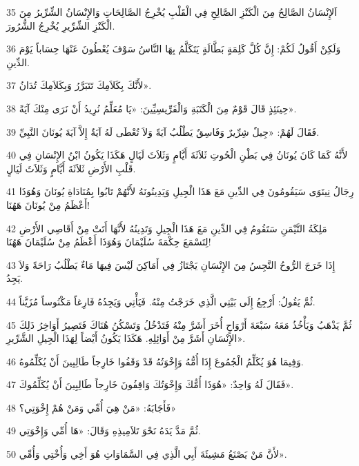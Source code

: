 \par 35 اَلإِنْسَانُ الصَّالِحُ مِنَ الْكَنْزِ الصَّالِحِ فِي الْقَلْبِ يُخْرِجُ الصَّالِحَاتِ وَالإِنْسَانُ الشِّرِّيرُ مِنَ الْكَنْزِ الشِّرِّيرِ يُخْرِجُ الشُّرُورَ.
\par 36 وَلَكِنْ أَقُولُ لَكُمْ: إِنَّ كُلَّ كَلِمَةٍ بَطَّالَةٍ يَتَكَلَّمُ بِهَا النَّاسُ سَوْفَ يُعْطُونَ عَنْهَا حِسَاباً يَوْمَ الدِّينِ.
\par 37 لأَنَّكَ بِكَلاَمِكَ تَتَبَرَّرُ وَبِكَلاَمِكَ تُدَانُ».
\par 38 حِينَئِذٍ قَالَ قَوْمٌ مِنَ الْكَتَبَةِ وَالْفَرِّيسِيِّينَ: «يَا مُعَلِّمُ نُرِيدُ أَنْ نَرَى مِنْكَ آيَةً».
\par 39 فَقَالَ لَهُمْ: «جِيلٌ شِرِّيرٌ وَفَاسِقٌ يَطْلُبُ آيَةً وَلاَ تُعْطَى لَهُ آيَةٌ إِلاَّ آيَةَ يُونَانَ النَّبِيِّ.
\par 40 لأَنَّهُ كَمَا كَانَ يُونَانُ فِي بَطْنِ الْحُوتِ ثَلاَثَةَ أَيَّامٍ وَثَلاَثَ لَيَالٍ هَكَذَا يَكُونُ ابْنُ الإِنْسَانِ فِي قَلْبِ الأَرْضِ ثَلاَثَةَ أَيَّامٍ وَثَلاَثَ لَيَالٍ.
\par 41 رِجَالُ نِينَوَى سَيَقُومُونَ فِي الدِّينِ مَعَ هَذَا الْجِيلِ وَيَدِينُونَهُ لأَنَّهُمْ تَابُوا بِمُنَادَاةِ يُونَانَ وَهُوَذَا أَعْظَمُ مِنْ يُونَانَ هَهُنَا!
\par 42 مَلِكَةُ التَّيْمَنِ سَتَقُومُ فِي الدِّينِ مَعَ هَذَا الْجِيلِ وَتَدِينُهُ لأَنَّهَا أَتَتْ مِنْ أَقَاصِي الأَرْضِ لِتَسْمَعَ حِكْمَةَ سُلَيْمَانَ وَهُوَذَا أَعْظَمُ مِنْ سُلَيْمَانَ هَهُنَا!
\par 43 إِذَا خَرَجَ الرُّوحُ النَّجِسُ مِنَ الإِنْسَانِ يَجْتَازُ فِي أَمَاكِنَ لَيْسَ فِيهَا مَاءٌ يَطْلُبُ رَاحَةً وَلاَ يَجِدُ.
\par 44 ثُمَّ يَقُولُ: أَرْجِعُ إِلَى بَيْتِي الَّذِي خَرَجْتُ مِنْهُ. فَيَأْتِي وَيَجِدُهُ فَارِغاً مَكْنُوساً مُزَيَّناً.
\par 45 ثُمَّ يَذْهَبُ وَيَأْخُذُ مَعَهُ سَبْعَةَ أَرْوَاحٍ أُخَرَ أَشَرَّ مِنْهُ فَتَدْخُلُ وَتَسْكُنُ هُنَاكَ فَتَصِيرُ أَوَاخِرُ ذَلِكَ الإِنْسَانِ أَشَرَّ مِنْ أَوَائِلِهِ. هَكَذَا يَكُونُ أَيْضاً لِهَذَا الْجِيلِ الشَّرِّيرِ».
\par 46 وَفِيمَا هُوَ يُكَلِّمُ الْجُمُوعَ إِذَا أُمُّهُ وَإِخْوَتُهُ قَدْ وَقَفُوا خَارِجاً طَالِبِينَ أَنْ يُكَلِّمُوهُ.
\par 47 فَقَالَ لَهُ وَاحِدٌ: «هُوَذَا أُمُّكَ وَإِخْوَتُكَ وَاقِفُونَ خَارِجاً طَالِبِينَ أَنْ يُكَلِّمُوكَ».
\par 48 فَأَجَابَهُ: «مَنْ هِيَ أُمِّي وَمَنْ هُمْ إِخْوَتِي؟»
\par 49 ثُمَّ مَدَّ يَدَهُ نَحْوَ تَلاَمِيذِهِ وَقَالَ: «هَا أُمِّي وَإِخْوَتِي.
\par 50 لأَنَّ مَنْ يَصْنَعُ مَشِيئَةَ أَبِي الَّذِي فِي السَّمَاوَاتِ هُوَ أَخِي وَأُخْتِي وَأُمِّي».

